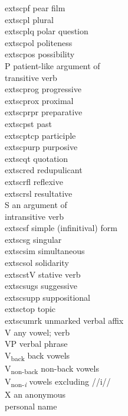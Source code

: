 \begin{multicols}{2}
\begin{tabbing}
	extsc{pf} \>  pear film \\
	extsc{pl} \>  plural\\
	extsc{plq} \>  polar question\\
	extsc{pol} \>  politeness\\
	extsc{pos} \>  possibility\\
P \>  patient-like argument of \\ \> transitive verb \\
	extsc{prog} \>  progressive\\
	extsc{prox} \>  proximal\\
	extsc{prpr} \>  preparative\\
	extsc{pst} \>  past\\
	extsc{ptcp} \>  participle\\
	extsc{purp} \>  purposive\\
	extsc{qt} \>  quotation\\
	extsc{red} \>  redupulicant\\
	extsc{rfl} \>  reflexive\\
	extsc{rsl} \>  resultative\\
S \>  an argument of \\ \> intransitive verb\\
	extsc{sf} \>  simple (infinitival) form\\
	extsc{sg} \>  singular\\
	extsc{sim} \>  simultaneous\\
	extsc{sol} \>  solidarity\\
	extsc{st}V \>  stative verb\\
	extsc{sugs} \>  suggessive\\
	extsc{supp} \>  suppositional\\
	extsc{top} \>  topic\\
	extsc{umrk} \>  unmarked verbal affix\\
V \>  any vowel; verb\\
VP \>  verbal phrase\\
V\textsubscript{back} \>  back vowels\\
V\textsubscript{non-back} \>  non-back vowels\\
V\textsubscript{non-\textit{i}} \>  vowels excluding //i//\\
X \>  an anonymous \\ \> personal name
\end{tabbing}
\end{multicols}

